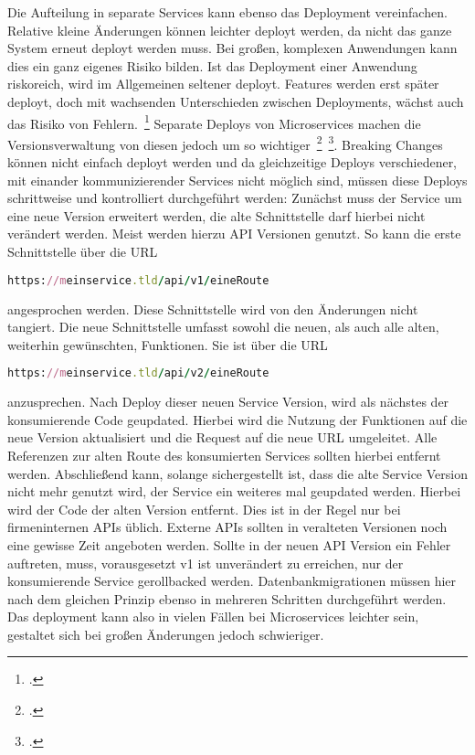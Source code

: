 Die Aufteilung in separate Services kann ebenso das Deployment vereinfachen. Relative kleine Änderungen können leichter deployt werden, da nicht das ganze System erneut deployt werden muss. Bei großen, komplexen Anwendungen kann dies ein ganz eigenes Risiko bilden. Ist das Deployment einer Anwendung riskoreich, wird im Allgemeinen seltener deployt. Features werden erst später deployt, doch mit wachsenden Unterschieden zwischen Deployments, wächst auch das Risiko von Fehlern.~\footcite[vgl.][Seite 6]{newman2015building}
Separate Deploys von Microservices machen die Versionsverwaltung von diesen jedoch um so wichtiger~\footcite[vgl.][Seite 62]{newman2015building}~\footcite[vgl.][]{Vergleichsartikel}. Breaking Changes können nicht einfach deployt werden und da gleichzeitige Deploys verschiedener, mit einander kommunizierender Services nicht möglich sind, müssen diese Deploys schrittweise und kontrolliert durchgeführt werden: Zunächst muss der Service um eine neue Version erweitert werden, die alte Schnittstelle darf hierbei nicht verändert werden. Meist werden hierzu API Versionen genutzt. So kann die erste Schnittstelle über die URL

\begin{lstlisting}[language=Ruby]
https://meinservice.tld/api/v1/eineRoute
\end{lstlisting}

angesprochen werden. Diese Schnittstelle wird von den Änderungen nicht tangiert. Die neue Schnittstelle umfasst sowohl die neuen, als auch alle alten, weiterhin gewünschten, Funktionen. Sie ist über die URL

\begin{lstlisting}[language=Ruby]
https://meinservice.tld/api/v2/eineRoute
\end{lstlisting}

anzusprechen. Nach Deploy dieser neuen Service Version, wird als nächstes der konsumierende Code geupdated. Hierbei wird die Nutzung der Funktionen auf die neue Version aktualisiert und die Request auf die neue URL umgeleitet. Alle Referenzen zur alten Route des konsumierten Services sollten hierbei entfernt werden. Abschließend kann, solange sichergestellt ist, dass die alte Service Version nicht mehr genutzt wird, der Service ein weiteres mal geupdated werden. Hierbei wird der Code der alten Version entfernt. Dies ist in der Regel nur bei firmeninternen APIs üblich. Externe APIs sollten in veralteten Versionen noch eine gewisse Zeit angeboten werden. Sollte in der neuen API Version ein Fehler auftreten, muss, vorausgesetzt v1 ist unverändert zu erreichen, nur der konsumierende Service gerollbacked werden. Datenbankmigrationen müssen hier nach dem gleichen Prinzip ebenso in mehreren Schritten durchgeführt werden. Das deployment kann also in vielen Fällen bei Microservices leichter sein, gestaltet sich bei großen Änderungen jedoch schwieriger.

